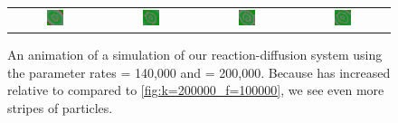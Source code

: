 \begin{figure}[h]
\begin{tabular}{c c c c}
\includegraphics[width = 0.19\textwidth]{../images/predator_prey_11_by_11_f_1.4_k_2_i4.png} & \includegraphics[width = 0.19\textwidth]{../images/../images/predator_prey_11_by_11_f_1.4_k_2_i5.png} & \includegraphics[width = 0.19\textwidth]{../images/../images/predator_prey_11_by_11_f_1.4_k_2_i6.png} & \includegraphics[width = 0.19\textwidth]{../images/../images/predator_prey_11_by_11_f_1.4_k_2_i7.png}
\end{tabular}
\caption{An animation of a simulation of our reaction-diffusion system using the parameter rates  = 140,000 and  = 200,000. Because  has increased relative to  compared to \autoref{fig:k=200000_f=100000}, we see even more stripes of  particles.}
\label{fig:k=200000_f=140000}
\end{figure}

